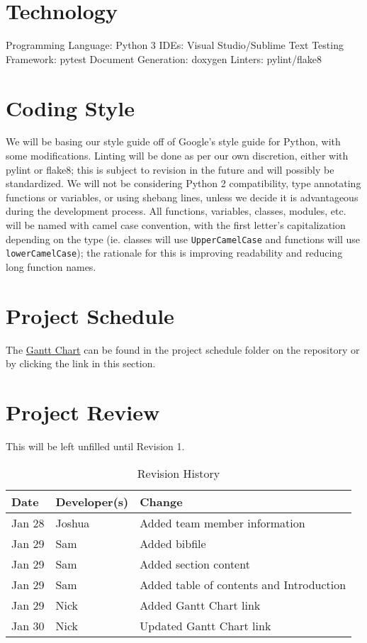 \documentclass{article}
\begin{document}
\section{Technology}
Programming Language: Python 3
IDEs: Visual Studio/Sublime Text
Testing Framework: pytest
Document Generation: doxygen
Linters: pylint/flake8

\section{Coding Style}
We will be basing our style guide off of Google’s style guide for Python, with 
some modifications. Linting will be done as per our own discretion, either with 
pylint or flake8; this is subject to revision in the future and will possibly be 
standardized. We will not be considering Python 2 compatibility, type annotating 
functions or variables, or using shebang lines, unless we decide it is 
advantageous during the development process. All functions, variables, classes, 
modules, etc. will be named with camel case convention, with the first letter’s 
capitalization depending on the type (ie. classes will use 
\texttt{UpperCamelCase} and functions will use \texttt{lowerCamelCase}); the 
rationale for this is improving readability and reducing long function names.

\section{Project Schedule}
The \href{https://gitlab.cas.mcmaster.ca/guinnesj/google-images-downloader/blob/master/ProjectSchedule/Gantt-Chart.pdf}{Gantt Chart} can be found in the project schedule folder on the repository or by clicking the link in this section.

\section{Project Review}
This will be left unfilled until Revision 1.

\printbibliography{}

\begin{table}[h]
\caption{Revision History} \label{TblRevisionHistory}
\begin{tabularx}{\textwidth}{llX}
\toprule
\textbf{Date} & \textbf{Developer(s)} & \textbf{Change}\\
\midrule
Jan 28 & Joshua & Added team member information\\
Jan 29 & Sam & Added bibfile\\
Jan 29 & Sam & Added section content\\
Jan 29 & Sam & Added table of contents and Introduction\\
Jan 29 & Nick & Added Gantt Chart link\\
Jan 30 & Nick & Updated Gantt Chart link\\
\bottomrule
\end{tabularx}
\end{table}
\end{document}
